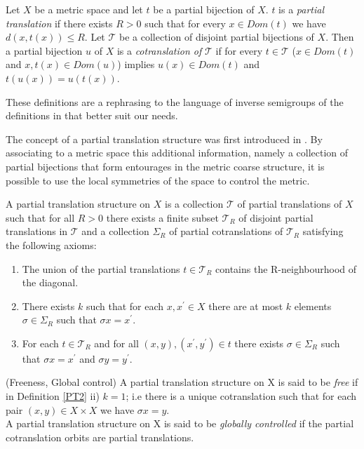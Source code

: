 \begin{corollary}
\begin{definition}
Let $X$ be a metric space and let $t$ be a partial bijection of $X$. $t$ is a \textit{partial translation} if there exists $R>0$ such that for every $x \in Dom(t)$ we have $d(x,t(x))\leq R$. Let $\mathcal{T}$ be a collection of disjoint partial bijections of $X$. Then a partial bijection $u$ of $X$ is a \textit{cotranslation of} $\mathcal{T}$ if for every $t \in \mathcal{T}$ ($x \in Dom(t)$ and $x,t(x) \in Dom(u)$) implies $u(x) \in Dom(t)$ and $t(u(x))=u(t(x))$.
\end{definition}

These definitions are a rephrasing to the language of inverse semigroups of the definitions in \cite{MR2363428} that better suit our needs. 

The concept of a partial translation structure was first introduced in \cite{MR2363428}. By associating to a metric space this additional information, namely a collection of partial bijections that form entourages in the metric coarse structure, it is possible to use the local symmetries of the space to control the metric. 


\begin{definition}\label{PT2}
A partial translation structure on $X$ is a collection $\mathcal{T}$ of partial translations of $X$ such that for all $R>0$ there exists a finite subset $\mathcal{T}_{R}$ of disjoint partial translations in $\mathcal{T}$ and a collection $\Sigma_{R}$ of partial cotranslations of $\mathcal{T}_{R}$ satisfying the following axioms:
\begin{enumerate}
\item The union of the partial translations  $t \in \mathcal{T}_{R}$ contains the R-neighbourhood of the diagonal.
\item There exists $k$ such that for each $x,x^{'} \in X$ there are at most $k$ elements $\sigma \in \Sigma_{R}$ such that $\sigma x=x^{'}$.
\item For each $t \in \mathcal{T}_{R}$ and for all $(x,y),(x^{'},y^{'}) \in t$ there exists $\sigma \in \Sigma_{R}$ such that $\sigma x=x^{'}$ and $\sigma y=y^{'}$.
\end{enumerate}
\end{definition}

\begin{definition}(Freeness, Global control)
A partial translation structure on X is said to be \textit{free} if in Definition \ref{PT2} ii) $k=1$; i.e there is a unique cotranslation such that for each pair $(x,y)\in X \times X$ we have $\sigma x = y$.\\
A partial translation structure on X is said to be \textit{globally controlled} if the partial cotranslation orbits are partial translations. 
\end{definition}


\end{corollary}
